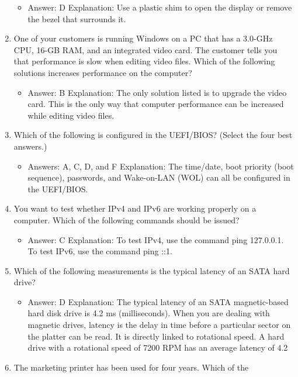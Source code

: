 \documentclass{article}
\begin{document}
\begin{enumerate}
    \begin{itemize}
        \item Answer: D
Explanation: Use a plastic shim to open the display or remove the bezel that surrounds
it.
    \end{itemize}
    \item One of your customers is running Windows on a PC that has a
3.0-GHz CPU, 16-GB RAM, and an integrated video card. The customer
tells you that performance is slow when editing video files.
Which of the following solutions increases performance on the
computer?
    \begin{itemize}
        \item Answer: B
Explanation: The only solution listed is to upgrade the video card. This is the only way
that computer performance can be increased while editing video files.
    \end{itemize}
    \item Which of the following is configured in the UEFI/BIOS? (Select the
four best answers.)
    \begin{itemize}
        \item Answers: A, C, D, and F
Explanation: The time/date, boot priority (boot sequence), passwords, and
Wake-on-LAN (WOL) can all be configured in the UEFI/BIOS.
    \end{itemize}
    \item You want to test whether IPv4 and IPv6 are working properly on a
computer. Which of the following commands should be issued?
    \begin{itemize}
        \item Answer: C
Explanation: To test IPv4, use the command ping 127.0.0.1. To test IPv6, use the
command ping ::1.
    \end{itemize}
    \item Which of the following measurements is the typical latency of an
SATA hard drive?
    \begin{itemize}
        \item Answer: D
Explanation: The typical latency of an SATA magnetic-based hard disk drive is 4.2 ms
(milliseconds). When you are dealing with magnetic drives, latency is the delay in time
before a particular sector on the platter can be read. It is directly linked to rotational
speed. A hard drive with a rotational speed of 7200 RPM has an average latency of 4.2
    \end{itemize}
    \item The marketing printer has been used for four years. Which of the

\end{enumerate}
\end{document}
